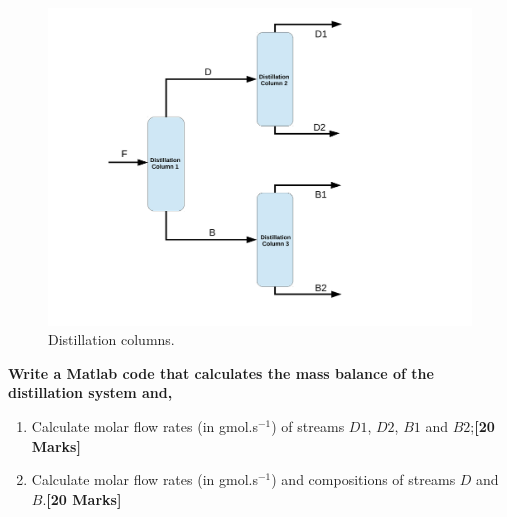 \documentclass[12pts,a4paper,amsmath,amssymb,floatfix]{article}%
\begin{document}
\begin{enumerate}[label=\bfseries Problem \arabic*:]
\begin{figure}[h]
\begin{center}
\includegraphics[width=15.cm,height=10.cm,clip]{./Pics/Practical_Distillation.pdf}
\caption{Distillation columns. }
\label{distillationcolumn}
\end{center}
\end{figure}

{\bf Write a Matlab code that calculates the mass balance of the distillation system and,}
\begin{enumerate}[label=\bfseries Task \arabic*]
\item Calculate molar flow rates (in gmol.s$^{-1}$) of streams $D1$, $D2$, $B1$ and $B2$;\hfill{\bf[20 Marks]}
\item Calculate molar flow rates (in gmol.s$^{-1}$) and compositions of streams $D$ and $B$.\hfill{\bf[20 Marks]}
\end{enumerate}

\end{enumerate}
\clearpage
\end{document}
